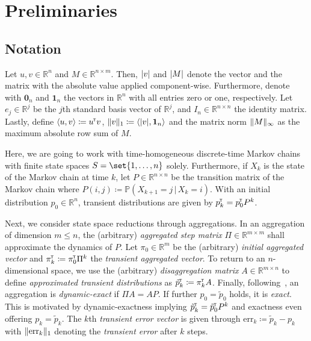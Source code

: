 \documentclass[runningheads]{llncs}
\newcommand*{\bbP}{\mathbb{P}}
\newcommand*{\bbR}{\mathbb{R}}
\newcommand*{\errvec}{\mathrm{err}}
\newcommand*{\transp}{^{\mkern-1.5mu{\scriptscriptstyle\mathsf{T}}}}
\DeclarePairedDelimiter{\abs}{\lvert}{\rvert}
\DeclarePairedDelimiter{\norm}{\lVert}{\rVert}
\DeclarePairedDelimiter{\inp}{\langle}{\rangle}
\begin{document}
\section{Preliminaries}\label{sec:preliminaries}
\subsection{Notation}\label{subsec:notation}
Let $u,v \in \bbR^n$ and $M \in \bbR^{n \times m}$.
Then, $\abs{v}$ and $\abs{M}$ denote the vector and the matrix with the absolute value applied component-wise.
Furthermore, denote with $\mathbf{0}_n$ and $\mathbf{1}_n$ the vectors in $\bbR^n$ with all entries zero or one, respectively.
Let $e_j \in \bbR^j$ be the $j$th standard basis vector of $\bbR^j$, and
$I_n \in \bbR^{n \times n}$ the identity matrix.
Lastly, define $\inp{u, v} \coloneqq u\transp v$, $\norm{v}_1 \coloneqq \inp{\abs{v}, \mathbf{1}_n}$ and the matrix norm $\norm{M}_\infty$ as the maximum absolute row sum of $M$.

Here, we are going to work with time-homogeneous discrete-time Markov chains with finite state spaces $S = \set{1, \dots, n}$ solely.
Furthermore, if $X_k$ is the state of the Markov chain at time $k$, let $P \in \bbR^{n \times n}$ be the transition matrix of the Markov chain where $P(i, j) \coloneqq \bbP(X_{k + 1} = j \,|\, X_k = i)$.
With an initial distribution $p_0 \in \bbR^n$, transient distributions are given by $p_k\transp = p_0\transp P^k$.

Next, we consider state space reductions through aggregations.
In an aggregation of dimension $m \leq n$, the (arbitrary) \emph{aggregated step matrix} $\Pi \in \bbR^{m \times m}$ shall approximate the dynamics of $P$.
Let $\pi_0 \in \bbR^m$ be the (arbitrary) \emph{initial aggregated vector} and $\pi_k\transp \coloneqq \pi_0\transp\Pi^k$ the \emph{transient aggregated vector}.
To return to an $n$-dimensional space, we use the (arbitrary) \emph{disaggregation matrix} $A \in \bbR^{m \times n}$ to define \emph{approximated transient distributions} as $\tilde{p}_k\transp \coloneqq \pi_k\transp A$.
Finally, following~\cite[Def.~8]{michel2025formalbounds}, an aggregation is \emph{dynamic-exact} if $\Pi A = A P$.
If further $p_0 = \tilde{p}_0$ holds, it is \emph{exact}.
This is motivated by dynamic-exactness implying $\tilde{p}_k\transp = \tilde{p}_0\transp P^k$ and exactness even offering $p_k = \tilde{p}_k$.
The $k$th \emph{transient error vector} is given through $\errvec_k \coloneqq \tilde{p}_k - p_k$ with $\norm{\errvec_k}_1$ denoting the \emph{transient error} after $k$ steps.
\end{document}
